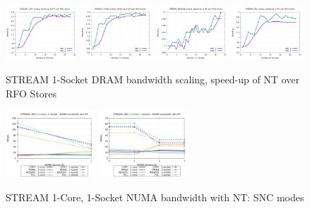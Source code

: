 \documentclass{article}
\begin{document}
\begin{figure}[!ht]
    \centering
    \includegraphics[width=0.24\textwidth]{../data/clx-8280l-snc/mem_bw_scale/mb_scale_compact_Copy_nt_rfo}
    \includegraphics[width=0.24\textwidth]{../data/clx-8280l-snc/mem_bw_scale/mb_scale_compact_Triad_nt_rfo}
    \includegraphics[width=0.24\textwidth]{../data/clx-8280l-snc/mem_bw_scale/mb_scale_compact_Reduce_nt_rfo}
    \includegraphics[width=0.24\textwidth]{../data/clx-8280l-snc/mem_bw_scale/mb_scale_compact_Fill_nt_rfo}
    \caption{STREAM 1-Socket DRAM bandwidth scaling, speed-up of NT over RFO Stores}
    \label{figure:mem_bw_scale_compact_nt_rfo_clx_snc}
\end{figure}

\begin{figure}[!ht]
    \centering
    \includegraphics[width=0.3\textwidth]{../data/clx-8280l-snc/mem_bw_numa/SNC-1_numa_nps1_compact_nt}
    \includegraphics[width=0.3\textwidth]{../data/clx-8280l-snc/mem_bw_numa/SNC-2_numa_nps2_compact_nt}
    \caption{STREAM 1-Core, 1-Socket NUMA bandwidth with NT: SNC modes}
    \label{figure:mem_bw_numa_nt_clx_snc}
\end{figure}
\end{document}
